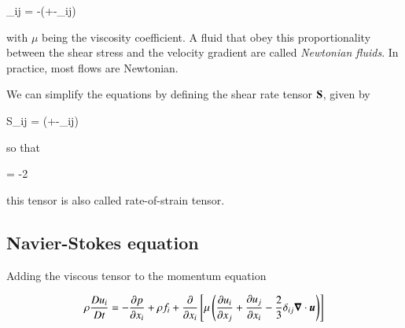 \beq
\pi_{ij} = -\mu \left(+-\delta_{ij}\right)
\eeq

\noindent with $\mu$ being the viscosity coefficient. A fluid that obey this proportionality between the shear stress and the
velocity gradient are called {\it Newtonian fluids}. In practice, most
flows are Newtonian.  

We can simplify the equations by defining the shear rate tensor
$\boldsymbol{\mathrm{S}}$, given by 

\beq
S_{ij} = \left(+-\delta_{ij}\right)
\eeq


\noindent so that 

\beq
\vt{\pi} = -2\mu{}
\eeq

\noindent this tensor is also called rate-of-strain tensor. 


\subsection{Navier-Stokes equation}

Adding the viscous tensor to the momentum equation

\begin{equation}
\rho\frac{D u_i}{D t}  = -\frac{\partial p}{\partial x_i} +\rho f_i +
\frac{\partial }{\partial x_i}\left[ \mu\left(\frac{\partial
      u_i}{\partial x_j}+\frac{\partial u_j}{\partial
      x_i}-\frac{2}{3}\delta_{ij}{\boldsymbol{\nabla}}\cdot{{\boldsymbol{u}}}\right)\right] 
\end{equation}





